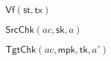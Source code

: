 \begin{minipage}[t]{0.49\textwidth}

\begin{algo}{$\mathsf{Vf}(\mathsf{st},\mathsf{tx})$}
\end{algo}

\begin{algo}{$\mathsf{SrcChk}(ac,\mathsf{sk},a)$}
\end{algo}

\begin{algo}{$\mathsf{TgtChk}(ac,\mathsf{mpk},\mathsf{tk},a')$}
\end{algo}

\end{minipage}






